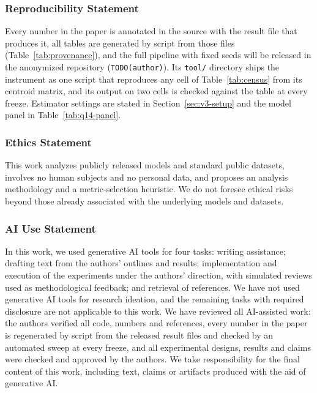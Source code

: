 \documentclass{article}
\theoremstyle{definition}
\theoremstyle{plain}
\theoremstyle{remark}
\begin{document}
\subsubsection*{Reproducibility Statement}
Every number in the paper is annotated in the source with the result file that produces it, all tables are generated by script from those files (Table~\ref{tab:provenance}), and the full pipeline with fixed seeds will be released in the anonymized repository (\texttt{TODO(author)}). Its \texttt{tool/} directory ships the instrument as one script that reproduces any cell of Table~\ref{tab:census} from its centroid matrix, and its output on two cells is checked against the table at every freeze. Estimator settings are stated in Section~\ref{sec:v3-setup} and the model panel in Table~\ref{tab:q14-panel}.

\subsubsection*{Ethics Statement}
This work analyzes publicly released models and standard public datasets, involves no human subjects and no personal data, and proposes an analysis methodology and a metric-selection heuristic. We do not foresee ethical risks beyond those already associated with the underlying models and datasets.

\subsubsection*{AI Use Statement}
In this work, we used generative AI tools for four tasks: writing assistance; drafting text from the authors' outlines and results; implementation and execution of the experiments under the authors' direction, with simulated reviews used as methodological feedback; and retrieval of references. We have not used generative AI tools for research ideation, and the remaining tasks with required disclosure are not applicable to this work. We have reviewed all AI-assisted work: the authors verified all code, numbers and references, every number in the paper is regenerated by script from the released result files and checked by an automated sweep at every freeze, and all experimental designs, results and claims were checked and approved by the authors. We take responsibility for the final content of this work, including text, claims or artifacts produced with the aid of generative AI.

\FloatBarrier


\end{document}
